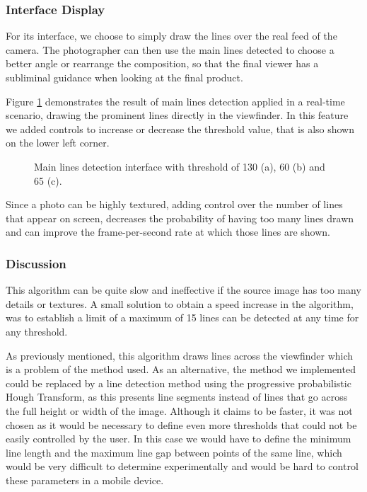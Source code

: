 \subsubsection{Interface Display}

For its interface, we choose to simply draw the lines over the real feed of the camera. The photographer can then use the main lines detected to choose a better angle or rearrange the composition, so that the final viewer has a subliminal guidance when looking at the final product.

Figure \ref{fig:mainline_interface} demonstrates the result of main lines detection applied in a real-time scenario, drawing the prominent lines directly in the viewfinder. In this feature we added controls to increase or decrease the threshold value, that is also shown on the lower left corner.

\begin{figure}[htbp]
	\centering
	\begin{minipage}[b]{\textwidth}
  		\centering
  	\end{minipage}
  	\caption{Main lines detection interface with threshold of 130 (a), 60 (b) and 65 (c).}    				\label{fig:mainline_interface}
\end{figure}

Since a photo can be highly textured, adding control over the number of lines that appear on screen, decreases the probability of having too many lines drawn and can improve the frame-per-second rate at which those lines are shown.

\subsubsection{Discussion}

This algorithm can be quite slow and ineffective if the source image has too many details or textures. A small solution to obtain a speed increase in the algorithm, was to establish a limit of a maximum of 15 lines can be detected at any time for any threshold.

As previously mentioned, this algorithm draws lines across the viewfinder which is a problem of the method used. As an alternative, the method we implemented could be replaced by a line detection method using the progressive probabilistic Hough Transform\cite{matas2000robust}, as this presents line segments instead of lines that go across the full height or width of the image. Although it claims to be faster, it was not chosen as it would be necessary to define even more thresholds that could not be easily controlled by the user. In this case we would have to define the minimum line length and the maximum line gap between points of the same line, which would be very difficult to determine experimentally and would be hard to control these parameters in a mobile device.

